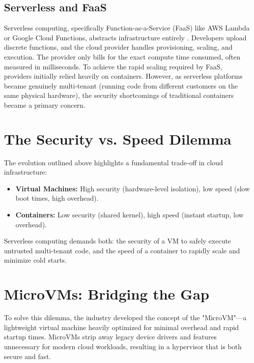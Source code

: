 \subsection{Serverless and FaaS}
Serverless computing, specifically Function-as-a-Service (FaaS) like AWS Lambda or Google Cloud Functions, abstracts infrastructure entirely \cite{jonas2019cloud}. Developers upload discrete functions, and the cloud provider handles provisioning, scaling, and execution. The provider only bills for the exact compute time consumed, often measured in milliseconds.
To achieve the rapid scaling required by FaaS, providers initially relied heavily on containers. However, as serverless platforms became genuinely multi-tenant (running code from different customers on the same physical hardware), the security shortcomings of traditional containers became a primary concern.

\section{The Security vs. Speed Dilemma}
The evolution outlined above highlights a fundamental trade-off in cloud infrastructure:
\begin{itemize}
    \item \textbf{Virtual Machines:} High security (hardware-level isolation), low speed (slow boot times, high overhead).
    \item \textbf{Containers:} Low security (shared kernel), high speed (instant startup, low overhead).
\end{itemize}

Serverless computing demands both: the security of a VM to safely execute untrusted multi-tenant code, and the speed of a container to rapidly scale and minimize cold starts.

\section{MicroVMs: Bridging the Gap}
To solve this dilemma, the industry developed the concept of the "MicroVM"---a lightweight virtual machine heavily optimized for minimal overhead and rapid startup times. MicroVMs strip away legacy device drivers and features unnecessary for modern cloud workloads, resulting in a hypervisor that is both secure and fast.

